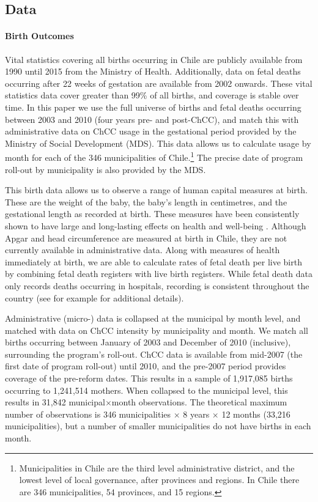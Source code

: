 \documentclass[12pt]{article}
\begin{document}
\begin{spacing}{1.4}
\section{Data}
\label{scn:data}
\paragraph{Birth Outcomes} Vital statistics covering all births
occurring in Chile are publicly available from 1990 until 2015 from
the Ministry of Health. Additionally, data on fetal deaths occurring
after 22 weeks of gestation are available from 2002 onwards. These vital
statistics data cover greater than 99\% of all births,
and coverage is stable over time.  In this paper we use the full
universe of births and fetal deaths occurring between 2003 and 2010
(four years pre- and post-ChCC), and match this with administrative
data on ChCC usage in the gestational period provided
by the Ministry of Social Development (MDS).  This data allows us
to calculate usage by month for each of the 346 municipalities of
Chile.\footnote{Municipalities in Chile are the third level
  administrative district, and the lowest level of local
  governance, after provinces and regions.  In Chile there are
  346 municipalities, 54 provinces, and 15 regions.}  The precise
date of program roll-out by municipality is also provided by the
MDS.

This birth data allows us to observe a range of human capital measures
at birth.  These are the weight of the baby, the baby's length
in centimetres, and the gestational length as recorded at birth. These
measures have been consistently shown to have large and long-lasting
effects on health and well-being \citep{AlmondCurrie2011b}.
Although Apgar and head circumference are measured at birth in
Chile, they are not currently available in administrative data.
Along with measures of health immediately at birth, we are able
to calculate rates of fetal death per live birth by combining
fetal death registers with live birth registers.  While fetal death
data only records deaths occurring in hospitals, recording is
consistent throughout the country (see for example
\citet[p.\ 22]{Rauetal2017} for additional details).  

Administrative (micro-) data is collapsed at the municipal by
month level, and matched with data on ChCC intensity by municipality
and month.  We match all births occurring between January of 2003
and December of 2010 (inclusive), surrounding the program's roll-out.
ChCC data is available from mid-2007 (the first date of program
roll-out) until 2010, and the pre-2007 period provides coverage of
the pre-reform dates.  This results in a sample of 1,917,085 births
occurring to 1,241,514 mothers. When collapsed to the municipal
level, this results in 31,842 municipal$\times$month observations.
The theoretical maximum number of observations is 346 municipalities
$\times$ 8 years $\times$ 12 months (33,216 municipalities), but a
number of smaller municipalities do not have births in each month.


\end{spacing}
\end{document}
